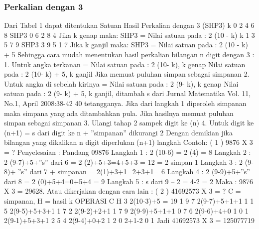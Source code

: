 \subsubsection {Perkalian dengan 3}
Dari Tabel 1 dapat ditentukan
Satuan Hasil Perkalian dengan 3 (SHP3)
k 0 2 4 6 8
SHP3 0 6 2 8 4
Jika k genap maka:
SHP3 = Nilai satuan pada : 2 (10 - k)
k 1 3 5 7 9
SHP3 3 9 5 1 7
Jika k ganjil maka:
SHP3 = Nilai satuan pada : 2 (10 - k) + 5
Sehingga cara mudah menentukan hasil
perkalian bilangan n digit dengan 3 :
1. Untuk angka terkanan =
Nilai satuan pada : 2 (10- k), k genap
Nilai satuan pada : 2 (10- k) + 5,
k ganjil
Jika memuat puluhan simpan sebagai
simpanan
2. Untuk angka di sebelah kirinya =
Nilai satuan pada : 2 (9- k), k genap
Nilai satuan pada : 2 (9- k) + 5,
k ganjil, ditambah s dari
Jurnal Matematika Vol. 11, No.1, April 2008:38-42
40
tetangganya.
Jika dari langkah 1 diperoleh
simpanan maka simpana yang ada
ditambahkan pula.
Jika hasilnya memuat puluhan simpan
sebagai simpanan
3. Ulangi tahap 2 sampek digit ke (n)
4. Untuk digit ke (n+1) =
s dari digit ke n + ”simpanan”
dikurangi 2
Dengan demikian jika bilangan yang
dikalikan n digit diperlukan (n+1) langkah
Contoh:
( 1 ) 9876 X 3 = ?
Penyelesaian : Pandang 09876
Langkah 1 : 2 (10-6) = 2 (4) = 8
Langkah 2 : 2 (9-7)+5+”s” dari 6
= 2 (2)+5+3=4+5+3 = 12
= 2 simpan 1
Langkah 3 : 2 (9-8)+
”s” dari 7 + simpanan
= 2(1)+3+1=2+3+1= 6
Langkah 4 : 2 (9-9)+5+”s” dari 8
= 2 (0)+5+4=0+5+4 = 9
Langkah 5 : s dari 9 – 2 = 4-2 = 2
Maka : 9876 X 3 = 29628.
Atau dikerjakan dengan cara lain :
( 2 ) 41692573 X 3 = ?
C = simpanan, H = hasil
k OPERASI C H
3 2(10-3)+5 = 19 1 9
7 2(9-7)+5+1+1 1 1
5 2(9-5)+5+3+1 1 7
2 2(9-2)+2+1 1 7
9 2(9-9)+5+1+1 0 7
6 2(9-6)+4+0 1 0
1 2(9-1)+5+3+1 2 5
4 2(9-4)+0+2 1 2
0 2+1-2 0 1
Jadi 41692573 X 3 = 125077719

